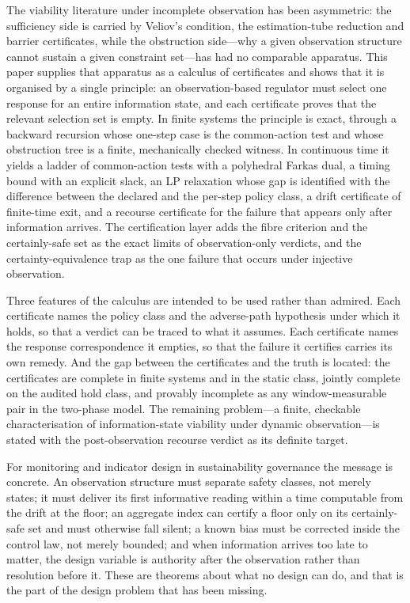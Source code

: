 \documentclass[11pt,a4paper]{article}
\theoremstyle{plain}
\theoremstyle{definition}
\theoremstyle{remark}
\begin{document}
The viability literature under incomplete observation has been asymmetric: the sufficiency side is carried by Veliov's condition, the estimation-tube reduction and barrier certificates, while the obstruction side---why a given observation structure cannot sustain a given constraint set---has had no comparable apparatus. This paper supplies that apparatus as a calculus of certificates and shows that it is organised by a single principle: an observation-based regulator must select one response for an entire information state, and each certificate proves that the relevant selection set is empty. In finite systems the principle is exact, through a backward recursion whose one-step case is the common-action test and whose obstruction tree is a finite, mechanically checked witness. In continuous time it yields a ladder of common-action tests with a polyhedral Farkas dual, a timing bound with an explicit slack, an LP relaxation whose gap is identified with the difference between the declared and the per-step policy class, a drift certificate of finite-time exit, and a recourse certificate for the failure that appears only after information arrives. The certification layer adds the fibre criterion and the certainly-safe set as the exact limits of observation-only verdicts, and the certainty-equivalence trap as the one failure that occurs under injective observation.

Three features of the calculus are intended to be used rather than admired. Each certificate names the policy class and the adverse-path hypothesis under which it holds, so that a verdict can be traced to what it assumes. Each certificate names the response correspondence it empties, so that the failure it certifies carries its own remedy. And the gap between the certificates and the truth is located: the certificates are complete in finite systems and in the static class, jointly complete on the audited hold class, and provably incomplete as any window-measurable pair in the two-phase model. The remaining problem---a finite, checkable characterisation of information-state viability under dynamic observation---is stated with the post-observation recourse verdict as its definite target.

For monitoring and indicator design in sustainability governance the message is concrete. An observation structure must separate safety classes, not merely states; it must deliver its first informative reading within a time computable from the drift at the floor; an aggregate index can certify a floor only on its certainly-safe set and must otherwise fall silent; a known bias must be corrected inside the control law, not merely bounded; and when information arrives too late to matter, the design variable is authority after the observation rather than resolution before it. These are theorems about what no design can do, and that is the part of the design problem that has been missing.
\end{document}
